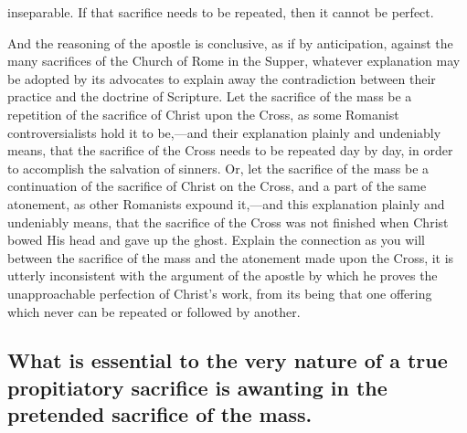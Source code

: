 \documentclass[]{book}
\begin{document}
inseparable. If that sacrifice needs to be repeated, then it cannot be perfect.

And the reasoning of the apostle is conclusive, as if by anticipation, against the many sacrifices of the Church of Rome in the Supper, whatever explanation may be adopted by its advocates to explain away the contradiction between their practice and the doctrine of Scripture. Let the sacrifice of the mass be a repetition of the sacrifice of Christ upon the Cross, as some Romanist controversialists hold it to be,---and their explanation plainly and undeniably means, that the sacrifice of the Cross needs to be repeated day by day, in order to accomplish the salvation of sinners. Or, let the sacrifice of the mass be a continuation of the sacrifice of Christ on the Cross, and a part of the same atonement, as other Romanists expound it,---and this explanation plainly and undeniably means, that the sacrifice of the Cross was not finished when Christ bowed His head and gave up the ghost. Explain the connection as you will between the sacrifice of the mass and the atonement made upon the Cross, it is utterly inconsistent with the argument of the apostle by which he proves the unapproachable perfection of Christ's work, from its being that one offering which never can be repeated or followed by another.

\hypertarget{what-is-essential-to-the-very-nature-of-a-true-propitiatory-sacrifice-is-awanting-in-the-pretended-sacrifice-of-the-mass.}{%
\subsection{What is essential to the very nature of a true propitiatory sacrifice is awanting in the pretended sacrifice of the mass.}\label{what-is-essential-to-the-very-nature-of-a-true-propitiatory-sacrifice-is-awanting-in-the-pretended-sacrifice-of-the-mass.}}
\end{document}

